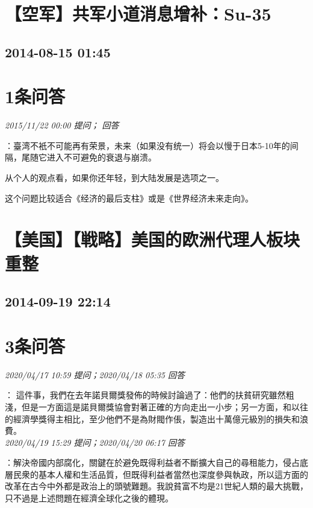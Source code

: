 \documentclass[twocolumn]{ctexart}
\begin{document}
\pagestyle{plain}

\section{【空军】共军小道消息增补：Su-35}
\subsection{2014-08-15 01:45}


\section{1条问答}

\textit{\hfill\noindent\small 2015/11/22 00:00 提问； 回答}

：臺湾不衹不可能再有荣景，未来（如果没有统一）将会以慢于日本5-10年的间隔，尾随它进入不可避免的衰退与崩溃。

从个人的观点看，如果你还年轻，到大陆发展是选项之一。

这个问题比较适合《经济的最后支柱》或是《世界经济未来走向》。\\


\section{【美国】【戦略】美国的欧洲代理人板块重整}
\subsection{2014-09-19 22:14}


\section{3条问答}

\textit{\hfill\noindent\small 2020/04/17 10:59 提问；2020/04/18 05:35 回答}

：
這件事，我們在去年諾貝爾獎發佈的時候討論過了：他們的扶貧研究雖然粗淺，但是一方面這是諾貝爾獎協會對著正確的方向走出一小步；另一方面，和以往的經濟學獎得主相比，至少他們不是為財閥作倀，製造出十萬億元級別的損失和浪費。
\\

\textit{\hfill\noindent\small 2020/04/19 15:29 提问；2020/04/20 06:17 回答}

：解決帝國内部腐化，關鍵在於避免既得利益者不斷擴大自己的尋租能力，侵占底層民衆的基本人權和生活品質，但既得利益者當然也深度參與執政，所以這方面的改革在古今中外都是政治上的頭號難題。我說貧富不均是21世紀人類的最大挑戰，只不過是上述問題在經濟全球化之後的體現。
\\
\end{document}
